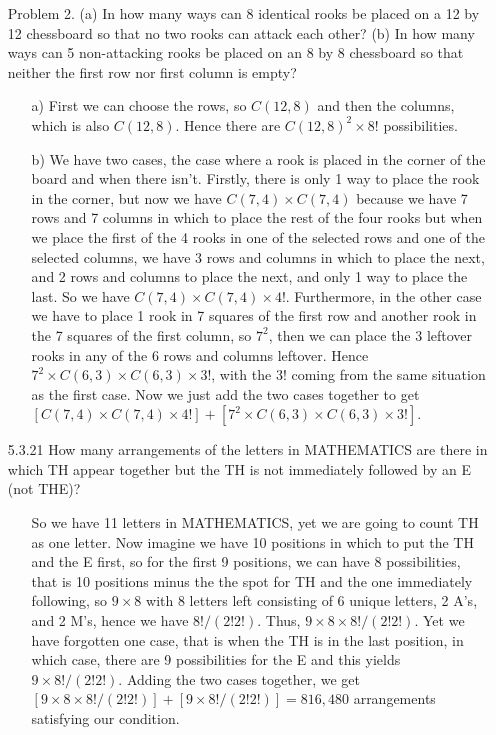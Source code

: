 \documentclass[12pt]{article}
\begin{document}
\begin{enumerate}
\item[Problem 2.] (a) In how many ways can 8 identical rooks be placed on a 12 by 12 chessboard
so that no two rooks can attack each other? (b) In how many ways can 5 non-attacking rooks be placed on
an 8 by 8 chessboard so that neither the first row nor first column is empty?
\begin{enumerate}
\item[a)] First we can choose the rows, so $C(12, 8)$ and then the columns, which is also $C(12, 8)$. Hence
there are $C(12, 8)^2 \times 8!$ possibilities.
\item[b)] We have two cases, the case where a rook is placed in the corner of the board and when there isn't. Firstly,
there is only 1 way to place the rook in the corner, but now we have $C(7, 4) \times C(7, 4)$ because we have 7 rows 
and 7 columns in which to place the rest of the four rooks but when we place the first of the 4 rooks 
in one of the selected rows and one of the selected columns, we have 3 rows and columns in which to place the next,
and 2 rows and columns to place the next, and only 1 way to place the last. So we have $C(7, 4) \times C(7, 4) \times 4!$.
Furthermore, in the other case we have to place 1 rook in 7 squares of the first row and another rook in the 7 squares of
the first column, so $7^2$, then we can place the 3 leftover rooks in any of the 6 rows and columns leftover. Hence
$7^2 \times C(6, 3) \times C(6, 3) \times 3!$, with the $3!$ coming from the same situation as the first case. Now we
just add the two cases together to get $[C(7, 4) \times C(7, 4) \times 4!] + [7^2 \times C(6, 3) \times C(6, 3) \times 3!]$.
\end{enumerate}

\item[5.3.21] How many arrangements of the letters in MATHEMATICS are there in which TH appear together but the TH is not immediately followed by an E (not THE)?
\begin{enumerate}
\item[] So we have 11 letters in MATHEMATICS, yet we are going to count TH as one letter. Now imagine we have
10 positions in which to put the TH and the E first, so for the first 9 positions, we can have 8 possibilities,
that is 10 positions minus the the spot for TH and the one immediately following, so $9 \times 8$ with
8 letters left consisting of 6 unique letters, 2 A's, and 2 M's, hence we have $8!/(2!2!)$. Thus, $9 \times 8
\times 8!/(2!2!)$. Yet we have forgotten one case, that is when the TH is in the last position, in which case, there
are 9 possibilities for the E and this yields $9 \times 8!/(2!2!)$. Adding the two cases together, we get
$[9 \times 8 \times 8!/(2!2!)] + [9 \times 8!/(2!2!)] = 816,480$ arrangements satisfying our condition.
\end{enumerate}


\end{enumerate}
\end{document}
